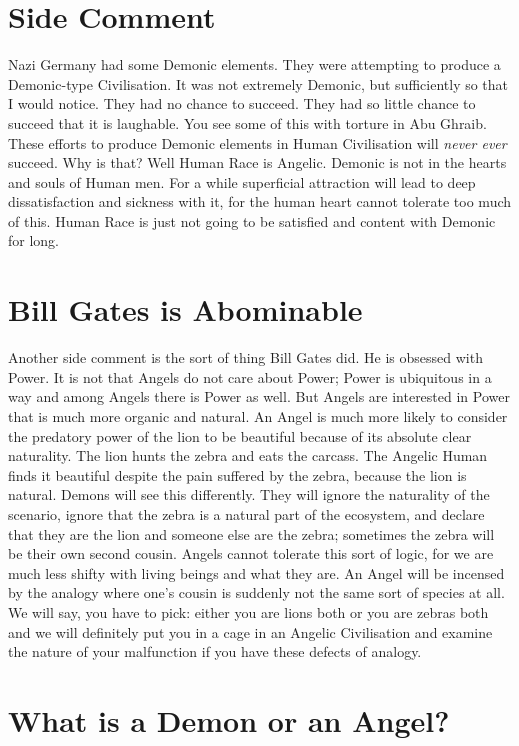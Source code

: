 \documentclass{amsart}
\begin{document}
\section{Side Comment}

Nazi Germany had some Demonic elements.  They were attempting to produce a Demonic-type Civilisation.  It was not extremely Demonic, but sufficiently so that I would notice.  They had no chance to succeed.  They had so little chance to succeed that it is laughable.  You see some of this with torture in Abu Ghraib.  These efforts to produce Demonic elements in Human Civilisation will {\em never ever} succeed.  Why is that?  Well Human Race is Angelic.  Demonic is not in the hearts and souls of Human men.  For a while superficial attraction will lead to deep dissatisfaction and sickness with it, for the human heart cannot tolerate too much of this.  Human Race is just not going to be satisfied and content with Demonic for long.  

\section{Bill Gates is Abominable}

Another side comment is the sort of thing Bill Gates did.  He is obsessed with Power.  It is not that Angels do not care about Power; Power is ubiquitous in a way and among Angels there is Power as well.  But Angels are interested in Power that is much more organic and natural.  An Angel is much more likely to consider the predatory power of the lion to be beautiful because of its absolute clear naturality.   The lion hunts the zebra and eats the carcass.  The Angelic Human finds it beautiful despite the pain suffered by the zebra, because the lion is natural.  Demons will see this differently.  They will ignore the naturality of the scenario, ignore that the zebra is a natural part of the ecosystem, and declare that they are the lion and someone else are the zebra; sometimes the zebra will be their own second cousin.  Angels cannot tolerate this sort of logic, for we are much less shifty with living beings and what they are. An Angel will be incensed by the analogy where one's cousin is suddenly not the same sort of species at all.  We will say, you have to pick: either you are lions both or you are zebras both and we will definitely put you in a cage in an Angelic Civilisation and examine the nature of your malfunction if you have these defects of analogy. 

\section{What is a Demon or an Angel?}
\end{document}
